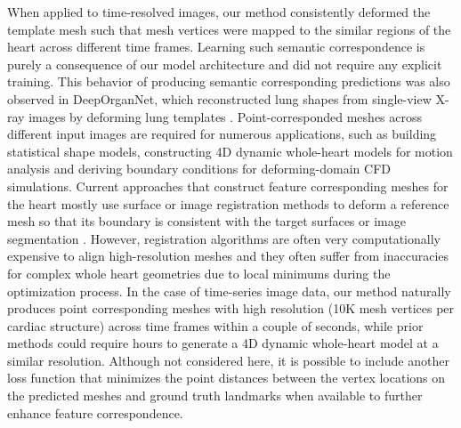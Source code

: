 \documentclass[times,review,preprint,authoryear]{elsarticle}
\begin{document}
When applied to time-resolved images, our method consistently deformed the template mesh such that mesh vertices were mapped to the similar regions of the heart across different time frames. Learning such semantic correspondence is purely a consequence of our model architecture and did not require any explicit training. This behavior of producing semantic corresponding predictions was also observed in DeepOrganNet, which reconstructed lung shapes from single-view X-ray images by deforming lung templates \citep{DeepOrganNet}. Point-corresponded meshes across different input images are required for numerous applications, such as building statistical shape models, constructing 4D dynamic whole-heart models for motion analysis and deriving boundary conditions for deforming-domain CFD simulations. Current approaches that construct feature corresponding meshes for the heart mostly use surface or image registration methods to deform a reference mesh so that its boundary is consistent with the target surfaces or image segmentation \citep{Ordas2007, Khalafvand2018, KONG2020}. However, registration algorithms are often very computationally expensive to align high-resolution meshes and they often suffer from inaccuracies for complex whole heart geometries due to local minimums during the optimization process. In the case of time-series image data, our method naturally produces point corresponding meshes with high resolution (10K mesh vertices per cardiac structure) across time frames within a couple of seconds, while prior methods could require hours to generate a 4D dynamic whole-heart model at a similar resolution. Although not considered here, it is possible to include another loss function that minimizes the point distances between the vertex locations on the predicted meshes and ground truth landmarks when available to further enhance feature correspondence. 


\end{document}
